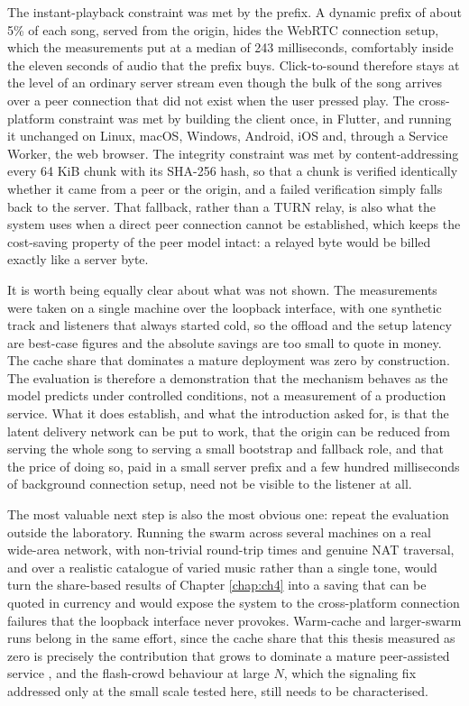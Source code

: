 \par The instant-playback constraint was met by the prefix. A dynamic prefix of about 5\% of each song, served from the origin, hides the WebRTC connection setup, which the measurements put at a median of 243 milliseconds, comfortably inside the eleven seconds of audio that the prefix buys. Click-to-sound therefore stays at the level of an ordinary server stream even though the bulk of the song arrives over a peer connection that did not exist when the user pressed play. The cross-platform constraint was met by building the client once, in Flutter, and running it unchanged on Linux, macOS, Windows, Android, iOS and, through a Service Worker, the web browser. The integrity constraint was met by content-addressing every 64 KiB chunk with its SHA-256 hash, so that a chunk is verified identically whether it came from a peer or the origin, and a failed verification simply falls back to the server. That fallback, rather than a TURN relay, is also what the system uses when a direct peer connection cannot be established, which keeps the cost-saving property of the peer model intact: a relayed byte would be billed exactly like a server byte.

\par It is worth being equally clear about what was not shown. The measurements were taken on a single machine over the loopback interface, with one synthetic track and listeners that always started cold, so the offload and the setup latency are best-case figures and the absolute savings are too small to quote in money. The cache share that dominates a mature deployment was zero by construction. The evaluation is therefore a demonstration that the mechanism behaves as the model predicts under controlled conditions, not a measurement of a production service. What it does establish, and what the introduction asked for, is that the latent delivery network can be put to work, that the origin can be reduced from serving the whole song to serving a small bootstrap and fallback role, and that the price of doing so, paid in a small server prefix and a few hundred milliseconds of background connection setup, need not be visible to the listener at all.

\indent \par The most valuable next step is also the most obvious one: repeat the evaluation outside the laboratory. Running the swarm across several machines on a real wide-area network, with non-trivial round-trip times and genuine NAT traversal, and over a realistic catalogue of varied music rather than a single tone, would turn the share-based results of Chapter \ref{chap:ch4} into a saving that can be quoted in currency and would expose the system to the cross-platform connection failures that the loopback interface never provokes. Warm-cache and larger-swarm runs belong in the same effort, since the cache share that this thesis measured as zero is precisely the contribution that grows to dominate a mature peer-assisted service \cite{spotify_p2p}, and the flash-crowd behaviour at large $N$, which the signaling fix addressed only at the small scale tested here, still needs to be characterised.

